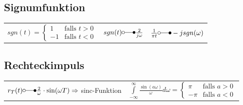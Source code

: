 	\subsection{Signumfunktion}
		\begin{tabular}{p{6cm} p{6cm} p{6cm}}
			$sgn(t) = \begin{cases} 1 & \text{falls }t > 0 \\ -1 & \text{falls }t < 0 \end{cases}$ &
			$sgn(t) \laplace \frac{2}{j\omega}$ &
			$\frac{1}{\pi t} \laplace -j sgn(\omega)$
		\end{tabular}
		
	\subsection{Rechteckimpuls}
		\begin{tabular}{p{9cm} p{9cm}}
			$r_T(t) \laplace \frac{2}{\omega} \cdot \sin(\omega T) \Rightarrow$ sinc-Funktion &
			$\int\limits_{-\infty}^{\infty} \frac{\sin(a \omega)}{\omega} d\omega = 
			\begin{cases} \pi & \text{falls }a > 0 \\ -\pi & \text{falls }a < 0 \end{cases}$
		\end{tabular}